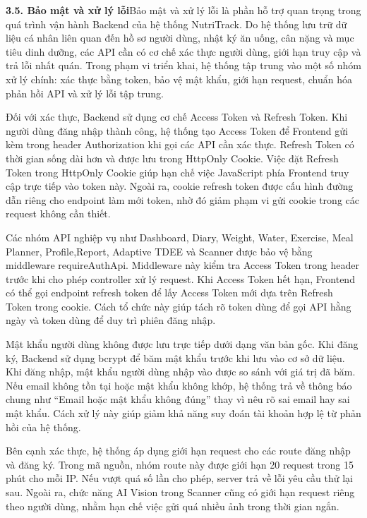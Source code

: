\textbf{3.5. Bảo mật và xử lý lỗi}Bảo mật và xử lý lỗi là phần hỗ trợ quan trọng trong quá trình vận hành Backend của hệ thống NutriTrack. Do hệ thống lưu trữ dữ liệu cá nhân liên quan đến hồ sơ người dùng, nhật ký ăn uống, cân nặng và mục tiêu dinh dưỡng, các API cần có cơ chế xác thực người dùng, giới hạn truy cập và trả lỗi nhất quán. Trong phạm vi triển khai, hệ thống tập trung vào một số nhóm xử lý chính: xác thực bằng token, bảo vệ mật khẩu, giới hạn request, chuẩn hóa phản hồi API và xử lý lỗi tập trung.

Đối với xác thực, Backend sử dụng cơ chế Access Token và Refresh Token. Khi người dùng đăng nhập thành công, hệ thống tạo Access Token để Frontend gửi kèm trong header Authorization khi gọi các API cần xác thực. Refresh Token có thời gian sống dài hơn và được lưu trong HttpOnly Cookie. Việc đặt Refresh Token trong HttpOnly Cookie giúp hạn chế việc JavaScript phía Frontend truy cập trực tiếp vào token này. Ngoài ra, cookie refresh token được cấu hình đường dẫn riêng cho endpoint làm mới token, nhờ đó giảm phạm vi gửi cookie trong các request không cần thiết.

Các nhóm API nghiệp vụ như Dashboard, Diary, Weight, Water, Exercise, Meal Planner, Profile,Report, Adaptive TDEE và Scanner được bảo vệ bằng middleware requireAuthApi. Middleware này kiểm tra Access Token trong header trước khi cho phép controller xử lý request. Khi Access Token hết hạn, Frontend có thể gọi endpoint refresh token để lấy Access Token mới dựa trên Refresh Token trong cookie. Cách tổ chức này giúp tách rõ token dùng để gọi API hằng ngày và token dùng để duy trì phiên đăng nhập.

Mật khẩu người dùng không được lưu trực tiếp dưới dạng văn bản gốc. Khi đăng ký, Backend sử dụng bcrypt để băm mật khẩu trước khi lưu vào cơ sở dữ liệu. Khi đăng nhập, mật khẩu người dùng nhập vào được so sánh với giá trị đã băm. Nếu email không tồn tại hoặc mật khẩu không khớp, hệ thống trả về thông báo chung như “Email hoặc mật khẩu không đúng” thay vì nêu rõ sai email hay sai mật khẩu. Cách xử lý này giúp giảm khả năng suy đoán tài khoản hợp lệ từ phản hồi của hệ thống.

Bên cạnh xác thực, hệ thống áp dụng giới hạn request cho các route đăng nhập và đăng ký. Trong mã nguồn, nhóm route này được giới hạn 20 request trong 15 phút cho mỗi IP. Nếu vượt quá số lần cho phép, server trả về lỗi yêu cầu thử lại sau. Ngoài ra, chức năng AI Vision trong Scanner cũng có giới hạn request riêng theo người dùng, nhằm hạn chế việc gửi quá nhiều ảnh trong thời gian ngắn.

